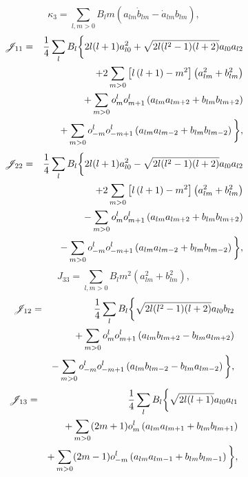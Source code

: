 \documentclass[twocolumn,prc,showpacs,preprintnumbers,superscriptaddress,floatfix]{revtex4}
\begin{document}
\begin{equation}
\kappa _{3}=\sum_{l,m>0}B_{l}m\left( a_{lm}\dot{b}_{lm}-\dot{a}%
_{lm}b_{lm}\right) ,  \label{kappa3}
\end{equation}%
\begin{eqnarray}
\mathscr{J}_{11} &=&\frac{1}{4}\sum_{l}B_{l}\bigg\{2l(l+1)a_{l0}^{2}+\sqrt{%
2l(l^{2}-1)(l+2)}a_{l0}a_{l2}  \notag \\
&&+2\sum_{m>0}\left[ l\left( l+1\right) -m^{2}\right] \left(
a_{lm}^{2}+b_{lm}^{2}\right)   \notag \\
&&+\sum_{m>0}o_{m}^{l}o_{m+1}^{l}\left( a_{lm}a_{lm+2}+b_{lm}b_{lm+2}\right)
\notag \\
&&+\sum_{m>0}o_{-m}^{l}o_{-m+1}^{l}\left(
a_{lm}a_{lm-2}+b_{lm}b_{lm-2}\right) \bigg\},  \label{J11}
\end{eqnarray}%
\begin{eqnarray}
\mathscr{J}_{22} &=&\frac{1}{4}\sum_{l}B_{l}\bigg\{2l(l+1)a_{l0}^{2}-\sqrt{%
2l(l^{2}-1)(l+2)}a_{l0}a_{l2}  \notag \\
&&+2\sum_{m>0}\left[ l\left( l+1\right) -m^{2}\right] \left(
a_{lm}^{2}+b_{lm}^{2}\right)   \notag \\
&&-\sum_{m>0}o_{m}^{l}o_{m+1}^{l}\left( a_{lm}a_{lm+2}+b_{lm}b_{lm+2}\right)
\notag \\
&&-\sum_{m>0}o_{-m}^{l}o_{-m+1}^{l}\left(
a_{lm}a_{lm-2}+b_{lm}b_{lm-2}\right) \bigg\},  \label{J22}
\end{eqnarray}%
\begin{equation}
J_{33}=\sum_{l,m>0}B_{l}m^{2}\left( a_{lm}^{2}+b_{lm}^{2}\right) ,
\label{J33}
\end{equation}%
\begin{eqnarray}
\mathscr{J}_{12} &=&\frac{1}{4}\sum_{l}B_{l}\bigg\{\sqrt{2l(l^{2}-1)(l+2)}%
a_{l0}b_{l2}  \notag \\
&&+\sum_{m>0}o_{m}^{l}o_{m+1}^{l}\left( a_{lm}b_{lm+2}-b_{lm}a_{lm+2}\right)
\notag \\
&&-\sum_{m>0}o_{-m}^{l}o_{-m+1}^{l}\left(
a_{lm}b_{lm-2}-b_{lm}a_{lm-2}\right) \bigg\},  \label{J12}
\end{eqnarray}%
\begin{eqnarray}
\mathscr{J}_{13} &=&\frac{1}{4}\sum_{l}B_{l}\bigg\{\sqrt{2l(l+1)}a_{l0}a_{l1}
\notag \\
&&+\sum_{m>0}(2m+1)o_{m}^{l}\left( a_{lm}a_{lm+1}+b_{lm}b_{lm+1}\right)
\notag \\
&&+\sum_{m>0}(2m-1)o_{-m}^{l}\left( a_{lm}a_{lm-1}+b_{lm}b_{lm-1}\right) %
\bigg\},  \label{J13}
\end{eqnarray}%
\end{document}
